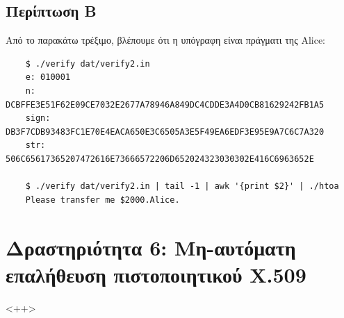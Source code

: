 \documentclass[12pt]{article}
\begin{document}
\subsection{Περίπτωση Β}

Από το παρακάτω τρέξιμο, βλέπουμε ότι η υπόγραφη είναι πράγματι της Alice:

\begin{lstlisting}
	$ ./verify dat/verify2.in
	e: 010001
	n: DCBFFE3E51F62E09CE7032E2677A78946A849DC4CDDE3A4D0CB81629242FB1A5
	sign: DB3F7CDB93483FC1E70E4EACA650E3C6505A3E5F49EA6EDF3E95E9A7C6C7A320
	str: 506C65617365207472616E73666572206D652024323030302E416C6963652E

	$ ./verify dat/verify2.in | tail -1 | awk '{print $2}' | ./htoa
	Please transfer me $2000.Alice.
\end{lstlisting}

\section{Δραστηριότητα 6: Μη-αυτόματη επαλήθευση πιστοποιητικού X.509}

<++>
\end{document}
